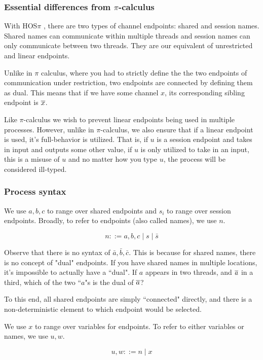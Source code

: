 \subsubsection{Essential differences from $\pi$-calculus}

With HOS$\pi$ , there are two types of channel endpoints: shared and session names. Shared names can communicate within multiple threads and session names can only communicate between two threads. They are our equivalent of unrestricted and linear endpoints.

Unlike in $\pi$ calculus, where you had to strictly define the the two endpoints of communication under restriction, two endpoints are connected by defining them as dual. This means that if we have some channel $x$, its corresponding sibling endpoint is $\overline{x}$.

Like $\pi$-calculus we wish to prevent linear endpoints being used in multiple processes. However, unlike in $\pi$-calculus, we also ensure that if a linear endpoint is used, it's full-behavior is utilized. That is, if $u$ is a session endpoint and takes in input and outputs some other value, if $u$ is only utilized to take in an input, this is a misuse of $u$ and no matter how you type $u$, the process will be considered ill-typed.

\subsubsection{Process syntax}

We use $a,b,c$ to range over shared endpoints and $s_i$ to range over session endpoints. Broadly, to refer to endpoints (also called names), we use $n$.

$$
n ::= a,b,c \mid s \mid \bar{s}
$$

Observe that there is no syntax of $\bar{a}, \bar{b}, \bar{c}$. This is because for shared names, there is no concept of "dual" endpoints. If you have shared names in multiple locations, it's impossible to actually have a ``dual". If $a$ appears in two threads, and $\overline{a}$ in a third, which of the two ``$a$"s is the dual of $\overline{a}$?

To this end, all shared endpoints are simply ``connected" directly, and there is a non-deterministic element to which endpoint would be selected.

We use $x$ to range over variables for endpoints. To refer to either variables or names, we use $u,w$.

$$
u,w ::= n \mid x
$$

